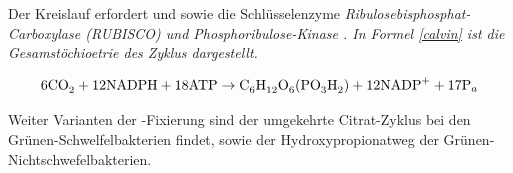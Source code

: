 \begin{enumerate}
		Der Kreislauf erfordert  und  sowie die Schlüsselenzyme
		\slshape{Ribulosebisphosphat-Carboxylase} (RUBISCO)
		und \slshape{Phosphoribulose-Kinase} \cite[S.657]{brock}.
		In Formel \ref{calvin} ist die Gesamstöchioetrie des Zyklus dargestellt.
		
		\begin{equation}
			6 \ce{CO2} + 12 \ce{NADPH} + 18 \ce{ATP} \rightarrow \ce{C6H12O6(PO3H2)} + 12 \ce{NADP+} + 17 \ce{P}_a
			\label{calvin}
		\end{equation}

		Weiter Varianten der -Fixierung sind der umgekehrte Citrat-Zyklus bei den Grünen-Schwelfelbakterien findet,
		sowie der Hydroxypropionatweg der Grünen-Nichtschwefelbakterien.

\end{enumerate}
